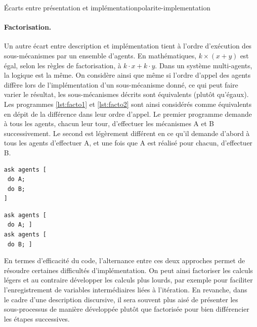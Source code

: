 \begin{encadre}{Écarts entre présentation et implémentation}{polarite-implementation}
\paragraph{Factorisation.} Un autre écart entre description et implémentation tient à l'ordre d'exécution des sous-mécanismes par un ensemble d'agents.
En mathématiques, $k\times (x+y)$ est égal, selon les règles de factorisation, à $k{\cdot}x + k{\cdot}y$.
Dans un système multi-agents, la logique est la même.
On considère ainsi que même si l'ordre d'appel des agents diffère lors de l'implémentation d'un sous-mécanisme donné, ce qui peut faire varier le résultat, les sous-mécanismes décrits sont équivalents (plutôt qu'égaux).
Les programmes \ref{lst:facto1} et \ref{lst:facto2} sont ainsi considérés comme équivalents en dépit de la différence dans leur ordre d'appel.
Le premier programme demande à tous les agents, chacun leur tour, d'effectuer les mécanismes A et B successivement.
Le second est légèrement différent en ce qu'il demande d'abord à tous les agents d'effectuer A, et une fois que A est réalisé pour chacun, d'effectuer B.\bigskip

\noindent\begin{minipage}[b]{.45\textwidth}
	\begin{lstlisting}[caption={Factorisé},frame=tlrb, captionpos=b, label = {lst:facto1}]
ask agents [
 do A;
 do B;
]
	\end{lstlisting}
\end{minipage}\hfill
\begin{minipage}[b]{.45\textwidth}
	\begin{lstlisting}[caption={Développé},frame=tlrb, captionpos=b, label = {lst:facto2}]
ask agents [
 do A; ]
ask agents [
 do B; ]
	\end{lstlisting}
\end{minipage}

En termes d'efficacité du code, l'alternance entre ces deux approches permet de résoudre certaines difficultés d'implémentation.
On peut ainsi factoriser les calculs légers et au contraire développer les calculs plus lourds, par exemple pour faciliter l'enregistrement de variables intermédiaires liées à l'itération. 
En revanche, dans le cadre d'une description discursive, il sera souvent plus aisé de présenter les sous-processus de manière développée plutôt que factorisée pour bien différencier les étapes successives.


\end{encadre}

